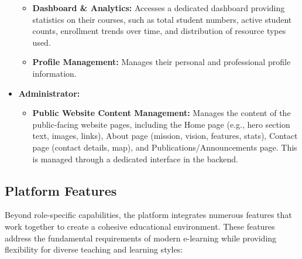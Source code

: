 \documentclass[12pt,a4paper]{article}
\begin{document}
\begin{itemize}
\begin{itemize}
        \item \textbf{Dashboard \& Analytics:} Accesses a dedicated dashboard providing statistics on their courses, such as total student numbers, active student counts, enrollment trends over time, and distribution of resource types used.
        \item \textbf{Profile Management:} Manages their personal and professional profile information.
    \end{itemize}
    \item \textbf{Administrator:}
    \begin{itemize}
        \item \textbf{Public Website Content Management:} Manages the content of the public-facing website pages, including the Home page (e.g., hero section text, images, links), About page (mission, vision, features, stats), Contact page (contact details, map), and Publications/Announcements page. This is managed through a dedicated interface in the backend.
    \end{itemize}
\end{itemize}

\subsection{Platform Features}

Beyond role-specific capabilities, the platform integrates numerous features that work together to create a cohesive educational environment. These features address the fundamental requirements of modern e-learning while providing flexibility for diverse teaching and learning styles:
\end{document}
